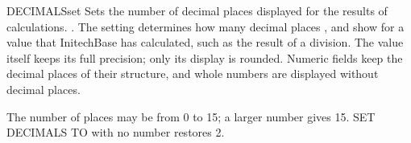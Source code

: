 \begin{XbaseEntry}{DECIMALS}{set}
Sets the number of decimal places displayed for the results of calculations.
\Syntax
{}
.
\Usage
The setting determines how many decimal places ,  and
 show for a value that InitechBase has calculated, such as the
result of a division.  The value itself keeps its full precision; only its
display is rounded.  Numeric fields keep the decimal places of their
structure, and whole numbers are displayed without decimal places.

The number of places may be from 0 to 15; a larger number gives 15.  SET
DECIMALS TO with no number restores 2.
\Examples
{}
\end{XbaseEntry}

